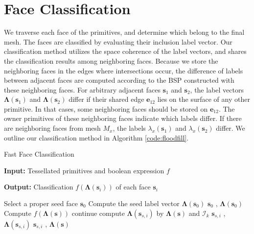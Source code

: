 

\section{Face Classification}

\label{sec:classification}


We traverse each face of the primitives, and determine which belong to the final mesh. The faces are classified by evaluating their inclusion label vector. Our classification method utilizes the space coherence of the label vectors, and shares the classification results among neighboring faces. Because we store the neighboring faces in the edges where intersections occur, the difference of labels between adjacent faces are computed according to the BSP constructed with these neighboring faces. For arbitrary adjacent faces $\bm{s}_1$ and $\bm{s}_2$, the label vectors $\bm{\Lambda}(\bm{s}_1)$ and $\bm{\Lambda}(\bm{s}_2)$ differ if their shared edge $\bm{e}_{12}$ lies on the surface of any other primitive.
In that cases, some neighboring faces should be stored on $\bm{e}_{12}$. The owner primitives of these neighboring faces indicate which labels differ. If there are neighboring faces from mesh $M_x$, the labels $\lambda_x(\bm{s}_1)$ and $\lambda_x(\bm{s}_2)$ differ. We outline our classification method in Algorithm \ref{code:floodfill}.

\begin{algorithm}[ht]
\caption{Fast Face Classification}
\label{code:floodfill}
\textbf{Input: } Tessellated primitives and boolean expression $f$

\textbf{Output: } Classification $f(\bm{\Lambda}(\bm{s}_i))$ of each face $\bm{s}_i$


\begin{algorithmic}[1]
\State Select a proper seed face $\bm{s}_0$
\State Compute the seed label vector $\boldsymbol{\Lambda}(\bm{s}_0)$
\State {} { $\bm{s}_0$ , $\boldsymbol{\Lambda}(\bm{s}_0)$}
\State
{}
    \State Compute $f(\boldsymbol{\Lambda}(\bm{s}))$
            \State continue
        \EndIf
            \State compute $\boldsymbol{\Lambda}(\bm{s}_{s, i})$ by $\boldsymbol{\Lambda}(\bm{s})$ and ${\bm{\mathcal{I}}}_k$
            \State {} { $\bm{s}_{s, i}$ , $\boldsymbol{\Lambda}(\bm{s}_{s, i})$}
        \Else
            \State {} { $\bm{s}_{s, i}$ , $\boldsymbol{\Lambda}(\bm{s})$}
        \EndIf
    \EndFor
\EndFunction
\end{algorithmic}
\end{algorithm}


